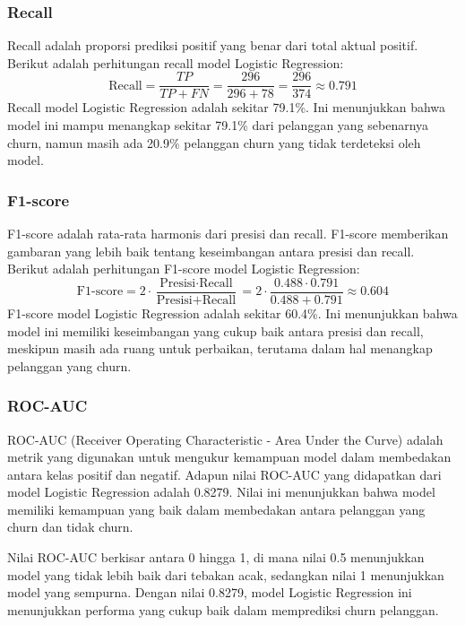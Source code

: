 \subsubsection*{Recall}

Recall adalah proporsi prediksi positif yang benar dari total aktual positif. Berikut adalah perhitungan recall model Logistic Regression:
\begin{equation}
    \text{Recall} = \frac{TP}{TP + FN} = \frac{296}{296 + 78} = \frac{296}{374} \approx 0.791
\end{equation}
Recall model Logistic Regression adalah sekitar 79.1\%. Ini menunjukkan bahwa model ini mampu menangkap sekitar 79.1\% dari pelanggan yang sebenarnya churn, namun masih ada 20.9\% pelanggan churn yang tidak terdeteksi oleh model.

\subsubsection*{F1-score}

F1-score adalah rata-rata harmonis dari presisi dan recall. F1-score memberikan gambaran yang lebih baik tentang keseimbangan antara presisi dan recall. Berikut adalah perhitungan F1-score model Logistic Regression:
\begin{equation}
    \text{F1-score} = 2 \cdot \frac{\text{Presisi} \cdot \text{Recall}}{\text{Presisi} + \text{Recall}} = 2 \cdot \frac{0.488 \cdot 0.791}{0.488 + 0.791} \approx 0.604
\end{equation}
F1-score model Logistic Regression adalah sekitar 60.4\%. Ini menunjukkan bahwa model ini memiliki keseimbangan yang cukup baik antara presisi dan recall, meskipun masih ada ruang untuk perbaikan, terutama dalam hal menangkap pelanggan yang churn.

\subsubsection*{ROC-AUC}
ROC-AUC (Receiver Operating Characteristic - Area Under the Curve) adalah metrik yang digunakan untuk mengukur kemampuan model dalam membedakan antara kelas positif dan negatif. Adapun nilai ROC-AUC yang didapatkan dari model Logistic Regression adalah 0.8279. Nilai ini menunjukkan bahwa model memiliki kemampuan yang baik dalam membedakan antara pelanggan yang churn dan tidak churn. 

Nilai ROC-AUC berkisar antara 0 hingga 1, di mana nilai 0.5 menunjukkan model yang tidak lebih baik dari tebakan acak, sedangkan nilai 1 menunjukkan model yang sempurna. Dengan nilai 0.8279, model Logistic Regression ini menunjukkan performa yang cukup baik dalam memprediksi churn pelanggan.

